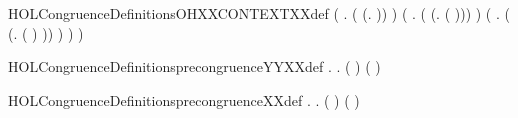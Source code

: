 \begin{SaveVerbatim}{HOLCongruenceDefinitionsOHXXCONTEXTXXdef}
                 (\HOLSymConst{\HOLTokenExists{}} . ( \HOLSymConst{=} (\HOLTokenLambda{}.  \HOLSymConst{\ensuremath{\parallel}}  )) \HOLSymConst{\HOLTokenConj{}}  ) \HOLSymConst{\HOLTokenDisj{}}
                 (\HOLSymConst{\HOLTokenExists{}} . ( \HOLSymConst{=} (\HOLTokenLambda{}. \HOLConst{\ensuremath{\nu}}  ( ))) \HOLSymConst{\HOLTokenConj{}}  ) \HOLSymConst{\HOLTokenDisj{}}
                 (\HOLSymConst{\HOLTokenExists{}} .
                      ( \HOLSymConst{=} (\HOLTokenLambda{}.  ( ) )) \HOLSymConst{\HOLTokenConj{}}
                       ) \HOLSymConst{\HOLTokenImp{}}
                  ) \HOLSymConst{\HOLTokenImp{}}
             )
\end{SaveVerbatim}
\newcommand{\HOLCongruenceDefinitionsOHXXCONTEXTXXdef}{\UseVerbatim{HOLCongruenceDefinitionsOHXXCONTEXTXXdef}}
\begin{SaveVerbatim}{HOLCongruenceDefinitionsprecongruenceYYXXdef}
\HOLTokenTurnstile{} \HOLSymConst{\HOLTokenForall{}}.
         \HOLSymConst{\HOLTokenEquiv{}}
         \HOLSymConst{\HOLTokenConj{}}
       \HOLSymConst{\HOLTokenForall{}}  .   \HOLSymConst{\HOLTokenImp{}}    \HOLSymConst{\HOLTokenImp{}}  ( ) ( )
\end{SaveVerbatim}
\newcommand{\HOLCongruenceDefinitionsprecongruenceYYXXdef}{\UseVerbatim{HOLCongruenceDefinitionsprecongruenceYYXXdef}}
\begin{SaveVerbatim}{HOLCongruenceDefinitionsprecongruenceXXdef}
\HOLTokenTurnstile{} \HOLSymConst{\HOLTokenForall{}}.
         \HOLSymConst{\HOLTokenEquiv{}}
         \HOLSymConst{\HOLTokenConj{}}
       \HOLSymConst{\HOLTokenForall{}}  .   \HOLSymConst{\HOLTokenImp{}}    \HOLSymConst{\HOLTokenImp{}}  ( ) ( )
\end{SaveVerbatim}
